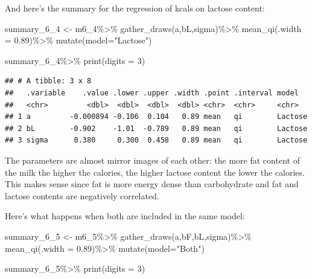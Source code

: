 \documentclass[
]{book}
\newenvironment{Shaded}{\begin{snugshade}}{\end{snugshade}}
\newcommand{\AttributeTok}[1]{\textcolor[rgb]{0.77,0.63,0.00}{#1}}
\newcommand{\DecValTok}[1]{\textcolor[rgb]{0.00,0.00,0.81}{#1}}
\newcommand{\FloatTok}[1]{\textcolor[rgb]{0.00,0.00,0.81}{#1}}
\newcommand{\FunctionTok}[1]{\textcolor[rgb]{0.00,0.00,0.00}{#1}}
\newcommand{\NormalTok}[1]{#1}
\newcommand{\OtherTok}[1]{\textcolor[rgb]{0.56,0.35,0.01}{#1}}
\newcommand{\SpecialCharTok}[1]{\textcolor[rgb]{0.00,0.00,0.00}{#1}}
\newcommand{\StringTok}[1]{\textcolor[rgb]{0.31,0.60,0.02}{#1}}
\begin{document}
And here's the summary for the regression of kcals on lactose content:

\begin{Shaded}
\begin{Highlighting}[]
\NormalTok{summary\_6\_4 }\OtherTok{\textless{}{-}}\NormalTok{ m6\_4}\SpecialCharTok{\%\textgreater{}\%}
  \FunctionTok{gather\_draws}\NormalTok{(a,bL,sigma)}\SpecialCharTok{\%\textgreater{}\%}
  \FunctionTok{mean\_qi}\NormalTok{(}\AttributeTok{.width =} \FloatTok{0.89}\NormalTok{)}\SpecialCharTok{\%\textgreater{}\%}
  \FunctionTok{mutate}\NormalTok{(}\AttributeTok{model=}\StringTok{"Lactose"}\NormalTok{)}

\NormalTok{summary\_6\_4}\SpecialCharTok{\%\textgreater{}\%}
  \FunctionTok{print}\NormalTok{(}\AttributeTok{digits =} \DecValTok{3}\NormalTok{)}
\end{Highlighting}
\end{Shaded}

\begin{verbatim}
## # A tibble: 3 x 8
##   .variable    .value .lower .upper .width .point .interval model  
##   <chr>         <dbl>  <dbl>  <dbl>  <dbl> <chr>  <chr>     <chr>  
## 1 a         -0.000894 -0.106  0.104   0.89 mean   qi        Lactose
## 2 bL        -0.902    -1.01  -0.789   0.89 mean   qi        Lactose
## 3 sigma      0.380     0.300  0.458   0.89 mean   qi        Lactose
\end{verbatim}

The parameters are almost mirror images of each other: the more fat content of the milk the higher the calories, the higher lactose content the lower the calories. This makes sense since fat is more energy dense than carbohydrate and fat and lactose contents are negatively correlated.

Here's what happens when both are included in the same model:

\begin{Shaded}
\begin{Highlighting}[]
\NormalTok{summary\_6\_5 }\OtherTok{\textless{}{-}}\NormalTok{ m6\_5}\SpecialCharTok{\%\textgreater{}\%}
  \FunctionTok{gather\_draws}\NormalTok{(a,bF,bL,sigma)}\SpecialCharTok{\%\textgreater{}\%}
  \FunctionTok{mean\_qi}\NormalTok{(}\AttributeTok{.width =} \FloatTok{0.89}\NormalTok{)}\SpecialCharTok{\%\textgreater{}\%}
  \FunctionTok{mutate}\NormalTok{(}\AttributeTok{model=}\StringTok{"Both"}\NormalTok{)}

\NormalTok{summary\_6\_5}\SpecialCharTok{\%\textgreater{}\%}
  \FunctionTok{print}\NormalTok{(}\AttributeTok{digits =} \DecValTok{3}\NormalTok{)}
\end{Highlighting}
\end{Shaded}
\end{document}
